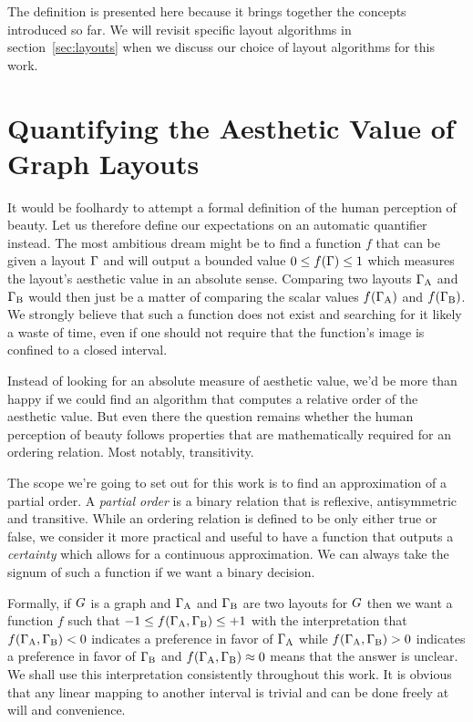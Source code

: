 \documentclass{graphstudy}
\begin{document}
The definition is presented here because it brings together the concepts introduced so far.  We will revisit specific
layout algorithms in \acl{section}~\ref{sec:layouts} when we discuss our choice of layout algorithms for this work.

\section{Quantifying the Aesthetic Value of Graph Layouts}
\label{sec:quanti}

It would be foolhardy to attempt a formal definition of the human perception of beauty.  Let us therefore define our
expectations on an automatic quantifier instead.  The most ambitious dream might be to find a function \(f\) that can be
given a layout \(\Gamma\) and will output a bounded value \(0\leq{}f(\Gamma)\leq1\) which measures the layout's
aesthetic value in an absolute sense.  Comparing two layouts \(\Gamma_\mathrm{A}\) and \(\Gamma_\mathrm{B}\) would
then just be a matter of comparing the scalar values \(f(\Gamma_\mathrm{A})\) and \(f(\Gamma_\mathrm{B})\).  We
strongly believe that such a function does not exist and searching for it likely a waste of time, even if one should not
require that the function's image is confined to a closed interval.

Instead of looking for an absolute measure of aesthetic value, we'd be more than happy if we could find an algorithm
that computes a relative order of the aesthetic value.  But even there the question remains whether the human perception
of beauty follows properties that are mathematically required for an ordering relation.  Most notably, transitivity.

The scope we're going to set out for this work is to find an approximation of a partial order.  A \emph{partial order}
is a binary relation that is reflexive, antisymmetric and transitive.  While an ordering relation is defined to be only
either true or false, we consider it more practical and useful to have a function that outputs a \emph{certainty} which
allows for a continuous approximation.  We can always take the signum of such a function if we want a binary decision.

Formally, if \(G\) is a graph and \(\Gamma_\mathrm{A}\) and \(\Gamma_\mathrm{B}\) are two layouts for \(G\)
then we want a function \(f\) such that \(-1\leq{}f(\Gamma_\mathrm{A},\Gamma_\mathrm{B})\leq+1\) with the
interpretation that \(f(\Gamma_\mathrm{A},\Gamma_\mathrm{B})<0\) indicates a preference in favor of
\(\Gamma_\mathrm{A}\) while \(f(\Gamma_\mathrm{A},\Gamma_\mathrm{B})>0\) indicates a preference in favor of
\(\Gamma_\mathrm{B}\) and \(f(\Gamma_\mathrm{A},\Gamma_\mathrm{B})\approx0\) means that the answer is unclear.  We
shall use this interpretation consistently throughout this work.  It is obvious that any linear mapping to another
interval is trivial and can be done freely at will and convenience.
\end{document}

